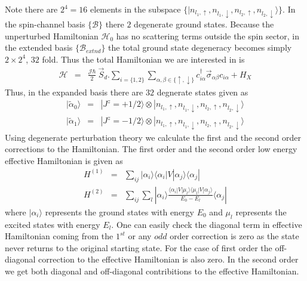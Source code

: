 \documentclass[reprint,prb,superscriptaddress]{revtex4-1}
\begin{document}
Note there are $2^4=16$ elements in the subspace $\{|n_{l_1,\uparrow},n_{l_1,\downarrow},n_{l_2,\uparrow},n_{l_2,\downarrow}\rangle\}$. In the spin-channel basis $\{\mathcal{B}\}$ there $2$ degenerate ground states. Because the unperturbed Hamiltonian $\mathcal{H}_0$ has no scattering terms outside the spin sector, in the extended basis $\{\mathcal{B}_{extnd}\}$ the total ground state degeneracy becomes simply $2\times 2^4$, $32$ fold. Thus the total Hamiltonian we are interested in is 
\begin{eqnarray}
\mathcal{H} &=& \frac{{\mathcal{J}}\hbar}{2}~ \vec{S}_d. \displaystyle\sum_{i=\{1,2\}} \displaystyle\sum_{\alpha,\beta\in\{\uparrow,\downarrow\}}c_{i\alpha}^{\dagger} \vec{\sigma}_{\alpha\beta} c_{i\alpha} +H_X
\label{eq:excitation_hamiltonian}
\end{eqnarray}
Thus, in the expanded basis there are $32$ degnerate states given as 
\begin{eqnarray}
|\tilde{\alpha}_0\rangle &=&|J^z=+1/2\rangle\otimes |n_{l_1,\uparrow},n_{l_1,\downarrow},n_{l_2,\uparrow},n_{l_2,\downarrow}\rangle \\
|\tilde{\alpha}_1\rangle &=& |J^z=-1/2 \rangle\otimes |n_{l_1,\uparrow},n_{l_1,\downarrow},n_{l_2,\uparrow},n_{l_2,\downarrow}\rangle
\end{eqnarray}
Using degenerate perturbation theory we calculate the first and the second order corrections to the Hamiltonian. The first order and the second order low energy effective Hamiltonian is given as 
\begin{eqnarray}
H^{(1)} &=& \sum_{ij} |\alpha_i\rangle \langle \alpha_i  | V| \alpha_j \rangle \langle \alpha_j |~\nonumber\\
H^{(2)} &=& \sum_{ij} \sum_l |\alpha_i\rangle \frac{\langle \alpha_i  | V| \mu_l \rangle \langle \mu_l  | V| \alpha_j \rangle}{E_0-E_{l}}\langle \alpha_j |
\end{eqnarray}
where $|\alpha_i\rangle$ represents the ground states with energy $E_0$ and $\mu_l$ represents the excited states with energy $E_l$. One can easily check the diagonal term in effective Hamiltonian coming from the $1^{st}$ or any $odd$ order correction is zero as the state never returns to the original starting state. For the case of first order the off-diagonal correction to the effective Hamiltonian is also zero. In the second order we get both diagonal and off-diagonal contribitions to the effective Hamiltonian. 
\end{document}
